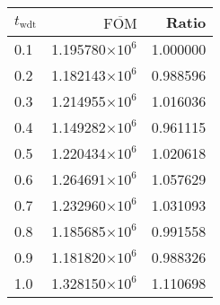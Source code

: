 \begin{tabular}{lrr}
\toprule
$t_{\mathrm{wdt}}$ & $\overline{\mathrm{FOM}}$ &    Ratio \\
\midrule
               0.1 &   1.195780$\times 10^{6}$ & 1.000000 \\
               0.2 &   1.182143$\times 10^{6}$ & 0.988596 \\
               0.3 &   1.214955$\times 10^{6}$ & 1.016036 \\
               0.4 &   1.149282$\times 10^{6}$ & 0.961115 \\
               0.5 &   1.220434$\times 10^{6}$ & 1.020618 \\
               0.6 &   1.264691$\times 10^{6}$ & 1.057629 \\
               0.7 &   1.232960$\times 10^{6}$ & 1.031093 \\
               0.8 &   1.185685$\times 10^{6}$ & 0.991558 \\
               0.9 &   1.181820$\times 10^{6}$ & 0.988326 \\
               1.0 &   1.328150$\times 10^{6}$ & 1.110698 \\
\bottomrule
\end{tabular}
